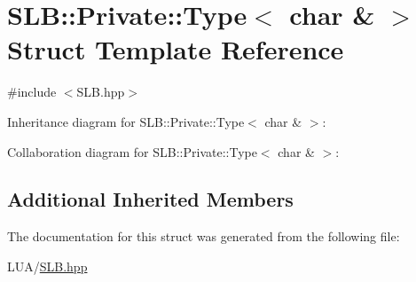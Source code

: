 \hypertarget{structSLB_1_1Private_1_1Type_3_01char_01_6_01_4}{}\section{S\+LB\+:\+:Private\+:\+:Type$<$ char \& $>$ Struct Template Reference}
\label{structSLB_1_1Private_1_1Type_3_01char_01_6_01_4}


{\ttfamily \#include $<$S\+L\+B.\+hpp$>$}



Inheritance diagram for S\+LB\+:\+:Private\+:\+:Type$<$ char \& $>$\+:


Collaboration diagram for S\+LB\+:\+:Private\+:\+:Type$<$ char \& $>$\+:
\subsection*{Additional Inherited Members}


The documentation for this struct was generated from the following file\+:\begin{DoxyCompactItemize}
\item 
L\+U\+A/\hyperlink{SLB_8hpp}{S\+L\+B.\+hpp}\end{DoxyCompactItemize}

